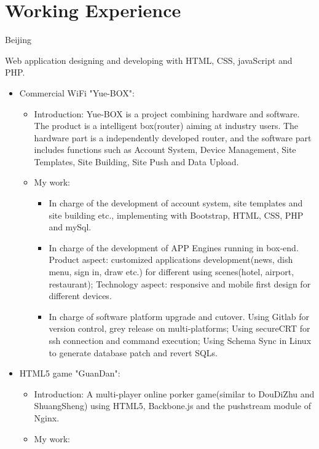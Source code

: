 \documentclass[11pt,a4paper,sans]{moderncv}        %
\begin{document}
\section{Working Experience}
 {Beijing}{}
{Web application designing and developing with HTML, CSS, javaScript and PHP.
\newline{}%
\begin{itemize}%
\item Commercial WiFi "Yue-BOX":
  \begin{itemize}%
  \item Introduction: Yue-BOX is a project combining hardware and software. The product is a intelligent box(router) aiming at industry users. The hardware part is a independently developed router, and the software part includes functions such as Account System, Device Management, Site Templates, Site Building, Site Push and Data Upload.
  \item My work:
      \begin{itemize}%
        \item In charge of the development of account system, site templates and site building etc., implementing with Bootstrap, HTML, CSS, PHP and mySql.
        \item In charge of the development of APP Engines running in box-end. Product aspect: customized applications development(news, dish menu, sign in, draw etc.) for different using scenes(hotel, airport, restaurant); Technology aspect: responsive and mobile first design for different devices.
        \item In charge of software platform upgrade and cutover. Using Gitlab for version control, grey release on multi-platforms; Using secureCRT for ssh connection and command execution; Using Schema Sync in Linux to generate database patch and revert SQLs.
      \end{itemize}
  \end{itemize}
\item HTML5 game "GuanDan":
  \begin{itemize}%
  \item Introduction: A multi-player online porker game(similar to DouDiZhu and ShuangSheng) using HTML5, Backbone.js and the pushstream module of Nginx.
  \item My work:

\end{itemize}
\end{itemize}}
\end{document}
